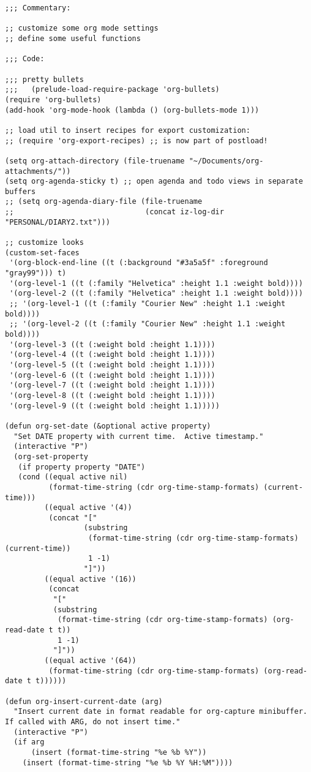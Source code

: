 \documentclass[11pt]{article}
\begin{document}
\begin{verbatim}
;;; Commentary:

;; customize some org mode settings
;; define some useful functions

;;; Code:

;;; pretty bullets
;;;   (prelude-load-require-package 'org-bullets)
(require 'org-bullets)
(add-hook 'org-mode-hook (lambda () (org-bullets-mode 1)))

;; load util to insert recipes for export customization:
;; (require 'org-export-recipes) ;; is now part of postload!

(setq org-attach-directory (file-truename "~/Documents/org-attachments/"))
(setq org-agenda-sticky t) ;; open agenda and todo views in separate buffers
;; (setq org-agenda-diary-file (file-truename
;;                              (concat iz-log-dir "PERSONAL/DIARY2.txt")))

;; customize looks
(custom-set-faces
 '(org-block-end-line ((t (:background "#3a5a5f" :foreground "gray99"))) t)
 '(org-level-1 ((t (:family "Helvetica" :height 1.1 :weight bold))))
 '(org-level-2 ((t (:family "Helvetica" :height 1.1 :weight bold))))
 ;; '(org-level-1 ((t (:family "Courier New" :height 1.1 :weight bold))))
 ;; '(org-level-2 ((t (:family "Courier New" :height 1.1 :weight bold))))
 '(org-level-3 ((t (:weight bold :height 1.1))))
 '(org-level-4 ((t (:weight bold :height 1.1))))
 '(org-level-5 ((t (:weight bold :height 1.1))))
 '(org-level-6 ((t (:weight bold :height 1.1))))
 '(org-level-7 ((t (:weight bold :height 1.1))))
 '(org-level-8 ((t (:weight bold :height 1.1))))
 '(org-level-9 ((t (:weight bold :height 1.1)))))

(defun org-set-date (&optional active property)
  "Set DATE property with current time.  Active timestamp."
  (interactive "P")
  (org-set-property
   (if property property "DATE")
   (cond ((equal active nil)
          (format-time-string (cdr org-time-stamp-formats) (current-time)))
         ((equal active '(4))
          (concat "["
                  (substring
                   (format-time-string (cdr org-time-stamp-formats) (current-time))
                   1 -1)
                  "]"))
         ((equal active '(16))
          (concat
           "["
           (substring
            (format-time-string (cdr org-time-stamp-formats) (org-read-date t t))
            1 -1)
           "]"))
         ((equal active '(64))
          (format-time-string (cdr org-time-stamp-formats) (org-read-date t t))))))

(defun org-insert-current-date (arg)
  "Insert current date in format readable for org-capture minibuffer.
If called with ARG, do not insert time."
  (interactive "P")
  (if arg
      (insert (format-time-string "%e %b %Y"))
    (insert (format-time-string "%e %b %Y %H:%M"))))


\end{verbatim}
\end{document}
